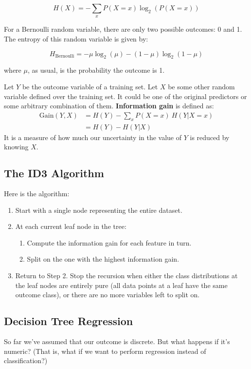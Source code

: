 $$ H(X) = - \sum_{x} P(X = x) \log_2\left(P(X = x)\right) $$

For a Bernoulli random variable, there are only two possible outcomes: 0 and 1. The entropy of this random variable is given by:

$$ H_\text{Bernoulli} = -\mu \log_2(\mu) - (1 - \mu) \log_2 (1 - \mu) $$

where $\mu$, as usual, is the probability the outcome is 1. 

Let $Y$ be the outcome variable of a training set. Let $X$ be some other random variable defined over the training set. It could be one of the original predictors or some arbitrary combination of them. \textbf{Information gain} is defined as:
\begin{align*} \text{Gain}(Y, X) &= H(Y) - \sum_{x} P(X = x)~ H(Y|X=x) \\
&= H(Y) - H(Y|X) \end{align*}
It is a measure of how much our uncertainty in the value of $Y$ is reduced by knowing $X$. 

\subsection{The ID3 Algorithm}

Here is the algorithm:
\begin{enumerate}
\item Start with a single node representing the entire dataset.
\item At each current leaf node in the tree:
\begin{enumerate}
\item Compute the information gain for each feature in turn.
\item Split on the one with the highest information gain.
\end{enumerate}
\item Return to Step 2. Stop the recursion when either the class distributions at the leaf nodes are entirely pure (all data points at a leaf have the same outcome class), or there are no more variables left to split on.
\end{enumerate}

\subsection{Decision Tree Regression}

So far we've assumed that our outcome is discrete. But what happens if it's numeric? (That is, what if we want to perform regression instead of classification?)

